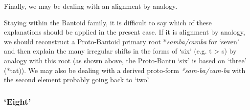 Finally, we may be dealing with an alignment by analogy. 

Staying within the Bantoid family, it is difficult to say which of these explanations should be applied in the present case. If it is alignment by analogy, we should reconstruct a Proto-Bantoid primary root *\textit{samba/camba} for `seven' and then explain the many irregular shifts in the forms of `six' (e.g. t > s) by analogy with this root (as shown above, the Proto-Bantu `six' is based on `three' (*tat)). We may also be dealing with a derived proto-form \textit{*sam-ba/cam-ba} with the second element probably going back to `two'.

\clearpage
\subsubsection{‘Eight’}\label{sec:3.1.1.6}
